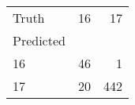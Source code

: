 \begin{tabular}{lrr}
\toprule
Truth & 16 & 17 \\
Predicted &  &  \\
\midrule
16 & 46 & 1 \\
17 & 20 & 442 \\
\bottomrule
\end{tabular}
